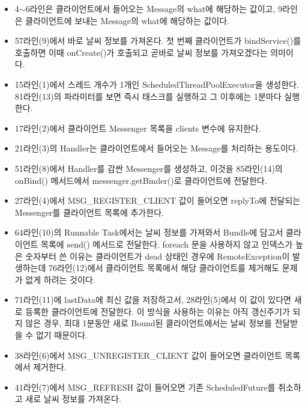 \begin{itemize}
\item 4$\sim$6라인은 클라이언트에서 들어오는 Message의 what에 해당하는 값이고, 9라인은 클라이언트에 보내는 Message의 what에 해당하는 값이다.
\item 57라인(9)에서 바로 날씨 정보를 가져온다. 첫 번째 클라이언트가 bindService()를 호출하면 이때 onCreate()가 호출되고 곧바로 날씨 정보를 가져오겠다는 의미이다.
\item 15라인(1)에서 스레드 개수가 1개인 ScheduledThreadPoolExecutor을 생성한다. 81라인(13)의 파라미터를 보면 즉시 태스크를 실행하고 그 이후에는 1분마다 실행한다.
\item 17라인(2)에서 클라이언트 Messenger 목록을 clients 변수에 유지한다.
\item 21라인(3)의 Handler는 클라이언트에서 들어오는 Message를 처리하는 용도이다.
\item 51라인(8)에서 Handler를 감싼 Messenger를 생성하고, 이것을 85라인(14)의 onBind() 메서드에서 messenger.getBinder()로 클라이언트에 전달한다.
\item 27라인(4)에서 MSG\_REGISTER\_CLIENT 값이 들어오면 replyTo에 전달되는 Messenger를 클라이언트 목록에 추가한다.
\item 64라인(10)의 Runnable Task에서는 날씨 정보를 가져와서 Bundle에 담고서 클라이언트 목록에 send() 메서드로 전달한다. foreach 문을 사용하지 않고 인덱스가 높은 숫자부터 쓴 이유는 클라이언트가 dead 상태인 경우에 RemoteException이 발생하는데 76라인(12)에서 클라이언트 목록에서 해당 클라이언트를 제거해도 문제가 없게 하려는 것이다.
\item 71라인(11)에 lastData에 최신 값을 저장하고서, 28라인(5)에서 이 값이 있다면 새로 등록한 클라이언트에 전달한다. 이 방식을 사용하는 이유는 아직 갱신주기가 되지 않은 경우, 최대 1분동안 새로 Bound된 클라이언트에서는 날씨 정보를 전달받을 수 없기 때문이다.
\item 38라인(6)에서 MSG\_UNREGISTER\_CLIENT 값이 들어오면 클라이언트 목록에서 제거한다.
\item 41라인(7)에서 MSG\_REFRESH 값이 들어오면 기존 ScheduledFuture를 취소하고 새로 날씨 정보를 가져온다.
\end{itemize}

